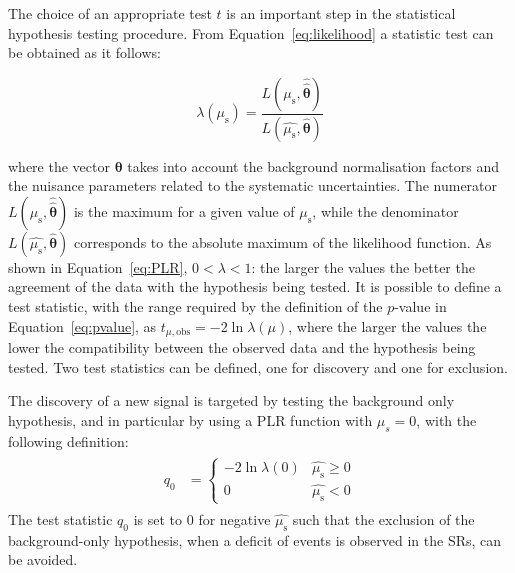 			The choice of an appropriate test $t$ is an important step in the statistical hypothesis testing procedure. From Equation~\ref{eq:likelihood} a statistic test can be obtained as it follows: 

			\begin{equation}
				\lambda \left ( \mu_{\mathrm{s}} \right ) = \frac{L\left ( \mu_{\mathrm{s}}, \hat{\hat{\bm{\theta}}} \right )}{L\left ( \hat{\mu_{\mathrm{s}}}, \hat{\bm{\theta}} \right )}
			\label{eq:PLR}
			\end{equation}

			\noindent where the vector $\bm{\theta}$ takes into account the background normalisation factors and the nuisance parameters related to the systematic uncertainties. The numerator $L\left ( \mu_{\mathrm{s}}, \hat{\hat{\bm{\theta}}} \right )$ is the maximum for a given value of $\mu_{\mathrm{s}}$, while the denominator $L\left ( \hat{\mu_{\mathrm{s}}}, \hat{\bm{\theta}} \right )$ corresponds to the absolute maximum of the likelihood function. As shown in Equation~\ref{eq:PLR}, $0 < \lambda < 1$: the larger the values the better the agreement of the data with the hypothesis being tested. It is possible to define a test statistic, with the range required by the definition of the $p$-value in Equation~\ref{eq:pvalue}, as $t_{\mu,\mathrm{obs}} = -2 \ln \lambda \left ( \mu \right )$, where the larger the values the lower the compatibility between the observed data and the hypothesis being tested. Two test statistics can be defined, one for discovery and one for exclusion.

			The discovery of a new signal is targeted by testing the background only hypothesis, and in particular by using a \ac{PLR} function with $\mu_s = 0$, with the following definition:
			\begin{align}
			\label{eq:test_discovery}
				\begin{split}
					q_0 & = 
					\begin{cases}
						-2 \ln \lambda \left( 0 \right ) & \hat{\mu_{\mathrm{s}}} \geq 0 \\
						0   & \hat{\mu_{\mathrm{s}}} < 0
					\end{cases}
				\end{split}
			\end{align}
			\noindent The test statistic $q_0$ is set to $0$ for negative $\hat{\mu_{\mathrm{s}}}$ such that the exclusion of the background-only hypothesis, when a deficit of events is observed in the \acp{SR}, can be avoided. 

